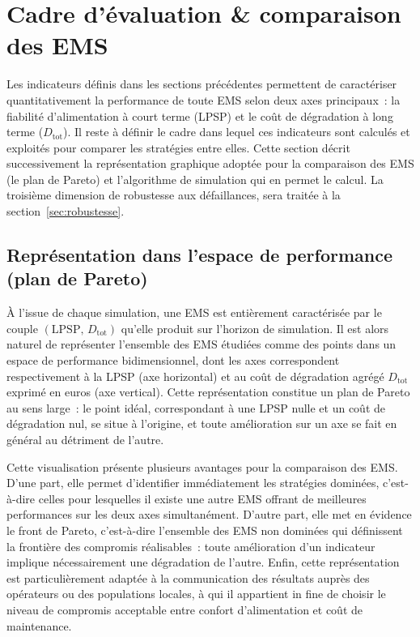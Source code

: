
\section{Cadre d'évaluation \& comparaison des EMS}
\label{sec:simulation}

Les indicateurs définis dans les sections précédentes permettent de caractériser quantitativement la performance de toute EMS selon deux axes principaux~: la fiabilité d'alimentation à court terme (LPSP) et le coût de dégradation à long terme ($D_{\text{tot}}$). Il reste à définir le cadre dans lequel ces indicateurs sont calculés et exploités pour comparer les stratégies entre elles. Cette section décrit successivement la représentation graphique adoptée pour la comparaison des EMS (le plan de Pareto) et l'algorithme de simulation qui en permet le calcul. La troisième dimension de robustesse aux défaillances, sera traitée à la section~\ref{sec:robustesse}.

\subsection{Représentation dans l'espace de performance (plan de Pareto)}

À l'issue de chaque simulation, une EMS est entièrement caractérisée par le couple $(\mathrm{LPSP},\, D_{\text{tot}})$ qu'elle produit sur l'horizon de simulation. Il est alors naturel de représenter l'ensemble des EMS étudiées comme des points dans un espace de performance bidimensionnel, dont les axes correspondent respectivement à la LPSP (axe horizontal) et au coût de dégradation agrégé $D_{\text{tot}}$ exprimé en euros (axe vertical). Cette représentation constitue un plan de Pareto au sens large~: le point idéal, correspondant à une LPSP nulle et un coût de dégradation nul, se situe à l'origine, et toute amélioration sur un axe se fait en général au détriment de l'autre.

Cette visualisation présente plusieurs avantages pour la comparaison des EMS. D'une part, elle permet d'identifier immédiatement les stratégies dominées, c'est-à-dire celles pour lesquelles il existe une autre EMS offrant de meilleures performances sur les deux axes simultanément. D'autre part, elle met en évidence le front de Pareto, c'est-à-dire l'ensemble des EMS non dominées qui définissent la frontière des compromis réalisables~: toute amélioration d'un indicateur implique nécessairement une dégradation de l'autre. Enfin, cette représentation est particulièrement adaptée à la communication des résultats auprès des opérateurs ou des populations locales, à qui il appartient in fine de choisir le niveau de compromis acceptable entre confort d'alimentation et coût de maintenance.

